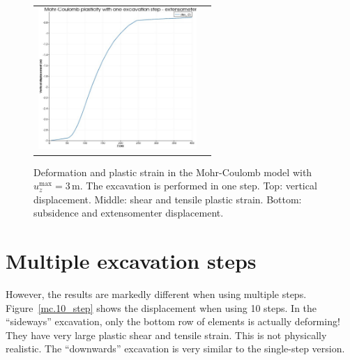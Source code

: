\documentclass[]{scrreprt}
\begin{document}
\begin{figure}[p]
\begin{center}
\begin{tabular}{cc}
\includegraphics[width=6cm]{mc_only_one_step_extensometer.pdf}
\end{tabular}
\caption{Deformation and plastic strain in the Mohr-Coulomb model with
  $u_{z}^{\mathrm{max}} = 3$\,m.  The excavation is performed in one step.  Top:
  vertical displacement.  Middle: shear and tensile plastic strain.
  Bottom: subsidence and extensomenter displacement.}
\label{mc.one_step}
\end{center}
\end{figure}

\section{Multiple excavation steps}

However, the results are markedly different when using multiple
steps.  Figure~\ref{mc.10_step} shows the displacement when using 10
steps.  In the ``sideways'' excavation, only the bottom row of
elements is actually deforming!  They have very large plastic shear
and tensile strain.  This is not physically realistic.  The
``downwards'' excavation is very similar to the single-step version.
\end{document}
